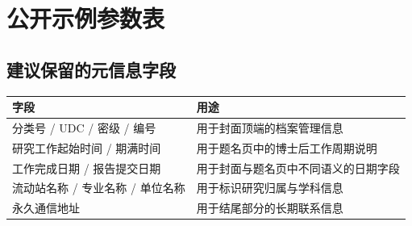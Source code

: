 \chapter{公开示例参数表}

\section{建议保留的元信息字段}

\begin{longtable}{@{}p{}p{}@{}}
  \toprule
  字段 & 用途 \\
  \midrule
  分类号 / UDC / 密级 / 编号 & 用于封面顶端的档案管理信息 \\
  研究工作起始时间 / 期满时间 & 用于题名页中的博士后工作周期说明 \\
  工作完成日期 / 报告提交日期 & 用于封面与题名页中不同语义的日期字段 \\
  流动站名称 / 专业名称 / 单位名称 & 用于标识研究归属与学科信息 \\
  永久通信地址 & 用于结尾部分的长期联系信息 \\
  \bottomrule
\end{longtable}
